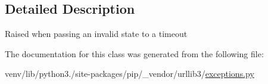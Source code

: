 \subsection{Detailed Description}
\begin{DoxyVerb}Raised when passing an invalid state to a timeout\end{DoxyVerb}
 

The documentation for this class was generated from the following file\+:\begin{DoxyCompactItemize}
\item 
venv/lib/python3./site-\/packages/pip/\+\_\+vendor/urllib3/\hyperlink{pip_2__vendor_2urllib3_2exceptions_8py}{exceptions.\+py}\end{DoxyCompactItemize}
